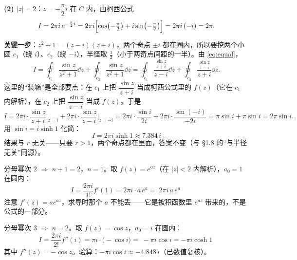 \textbf{(2) $|z|=2$}：$z=-\dfrac{\pi}{2}i$ 在 $C$ 内，由柯西公式
\[ I=2\pi i\,e^{-\frac{\pi}{2}i}
=2\pi i\Bigl[\cos\bigl(-\tfrac{\pi}{2}\bigr)+i\sin\bigl(-\tfrac{\pi}{2}\bigr)\Bigr]
=2\pi i\,(-i)=2\pi . \]


\qbreak
{}

\textbf{关键一步}：$z^{2}+1=(z-i)(z+i)$，两个奇点 $\pm i$ 都在圈内，所以要挖两个小圆 $c_1$（绕 $i$）、$c_2$（绕 $-i$），半径取 $\tfrac12$（小于两奇点间距的一半）。由 \eqref{eq:equal}，
\[ I=\oint_{c_1}\frac{\sin z}{z^{2}+1}\dd z+\oint_{c_2}\frac{\sin z}{z^{2}+1}\dd z
=\oint_{c_1}\frac{\frac{\sin z}{z+i}}{z-i}\dd z+\oint_{c_2}\frac{\frac{\sin z}{z-i}}{z+i}\dd z . \]
这里的“装箱”是全部要点：在 $c_1$ 上把 $\dfrac{\sin z}{z+i}$ 当成柯西公式里的 $f(z)$（它在 $c_1$ 内解析），在 $c_2$ 上把 $\dfrac{\sin z}{z-i}$ 当成 $f(z)$。于是
\[ I=2\pi i\cdot\frac{\sin z}{z+i}\Big|_{z=i}+2\pi i\cdot\frac{\sin z}{z-i}\Big|_{z=-i}
=2\pi i\cdot\frac{\sin i}{2i}+2\pi i\cdot\frac{\sin(-i)}{-2i}
=\pi\sin i+\pi\sin i=2\pi\sin i . \]
用 $\sin i=i\sinh1$ 化简：
\[ \boxed{\;I=2\pi i\sinh1\approx7.384\,i\;} \]
结果与 $r$ 无关——只要 $r>1$，两个奇点都在里面，答案不变（与 §1.8 的“与半径无关”同源）。

\qbreak
{}

分母幂次 $2$ $\Rightarrow$ $n+1=2$，$n=1$。取 $f(z)=e^{az}$（在 $|z|<2$ 内解析），$a_0=1$ 在圆内：
\[ I=\frac{2\pi i}{1!}f'(1)=2\pi i\cdot a\,e^{a}=\boxed{\;2\pi i\,a\,e^{a}\;} \]
注意 $f'(z)=ae^{az}$，求导时那个 $a$ 不能丢——它是被积函数里 $e^{az}$ 带来的，不是公式的一部分。

\qbreak
{}

分母幂次 $3$ $\Rightarrow$ $n=2$。取 $f(z)=\cos z$，$a_0=i$ 在圆内：
\[ I=\frac{2\pi i}{2!}f''(i)=\pi i\cdot\bigl(-\cos i\bigr)=\boxed{\;-\pi i\cos i=-\pi i\cosh1\;} \]
其中 $f''(z)=-\cos z$。验算：$-\pi i\cos i\approx-4.848\,i$（已数值复核）。


